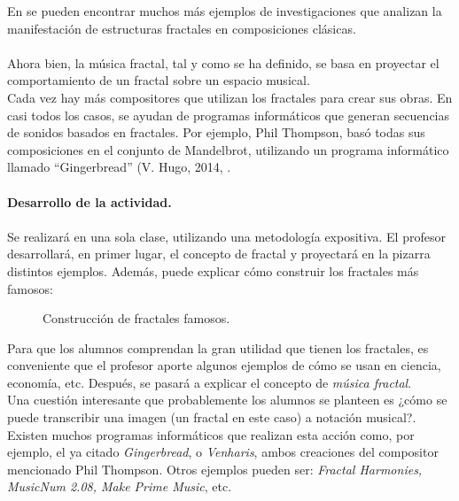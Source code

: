 \documentclass[a4paper, openright, 11pt, titlepage]{report}
\theoremstyle{definition}\newtheorem{defin}[propo]{Definition}
\theoremstyle{definition}\newtheorem{obser}[propo]{Remark}
\theoremstyle{definition}\newtheorem{ejem}[propo]{Ejemplo}
\theoremstyle{definition}\newtheorem{algoritmo}[propo]{Algoritmo}
\begin{document}
\begin{itemize}
    En \cite{fractales} se pueden encontrar muchos más ejemplos de investigaciones que analizan la manifestación de estructuras fractales en composiciones clásicas.\\\\
    Ahora bien, la música fractal, tal y como se ha definido, se basa en proyectar el comportamiento de un fractal sobre un espacio musical.\\
    Cada vez hay más compositores que utilizan los fractales para crear sus obras. En casi todos los casos, se ayudan de programas informáticos que generan secuencias de sonidos basados en fractales. Por ejemplo, Phil Thompson, basó todas sus composiciones en el conjunto de Mandelbrot, utilizando un programa informático llamado ``Gingerbread'' (V. Hugo, 2014, \cite{gingerbread}.\\\\
    \textbf{Desarrollo de la actividad.}\\\\
    Se realizará en una sola clase, utilizando una metodología expositiva. El profesor desarrollará, en primer lugar, el concepto de fractal y proyectará en la pizarra distintos ejemplos. Además, puede explicar cómo construir los fractales más famosos:
    \begin{figure}[H]
        \centering
         \hspace{1.7cm}
        \caption{Construcción de fractales famosos.}
    \end{figure}
\end{itemize}
Para que los alumnos comprendan la gran utilidad que tienen los fractales, es conveniente que el profesor aporte algunos ejemplos de cómo se usan en ciencia, economía, etc. Después, se pasará a explicar el concepto de \textit{música fractal}. \\
Una cuestión interesante que probablemente los alumnos se planteen es ¿cómo se puede transcribir una imagen (un fractal en este caso) a notación musical?. Existen muchos programas informáticos que realizan esta acción como, por ejemplo, el ya citado \textit{Gingerbread}, o \textit{Venharis}, ambos creaciones del compositor mencionado Phil Thompson. Otros ejemplos pueden ser: \textit{Fractal Harmonies, MusicNum 2.08, Make Prime Music}, etc.\\
\end{document}
